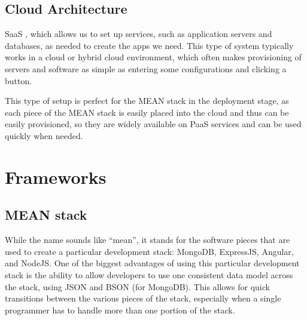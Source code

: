 \subsection{Cloud Architecture}
      \ac{SaaS} , which allows us to set up services, such as application servers and databases, as needed to create the apps we need. This type of system typically works in a cloud or hybrid cloud environment, which often makes provisioning of servers and software as simple as entering some configurations and clicking a button.
      
      This type of setup is perfect for the MEAN stack in the deployment stage, as each piece of the MEAN stack is easily placed into the cloud and thus can be easily provisioned, so they are widely available on PaaS services and can be used quickly when needed.
      
\section{Frameworks}
\subsection*{MEAN stack}
While the name sounds like “mean”, it stands for the software pieces that are used to create a particular development stack: MongoDB, ExpressJS, Angular, and NodeJS. One of the biggest advantages of using this particular development stack is the ability to allow developers to use one consistent data model across the stack, using \ac{JSON} and BSON (for MongoDB). This allows for quick transitions between the various pieces of the stack, especially when a single programmer has to handle more than one portion of the stack.


